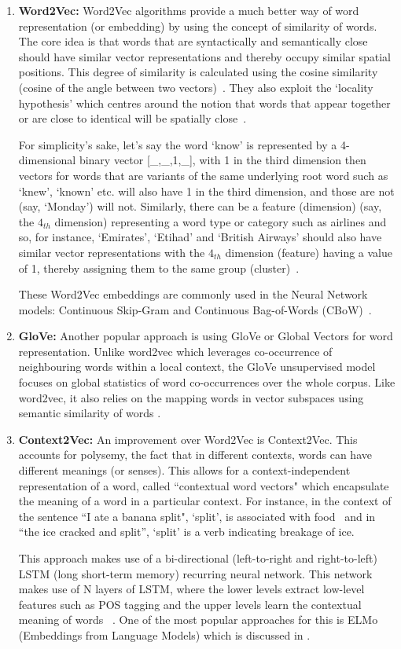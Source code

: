 \begin{enumerate}
    \item \textbf{Word2Vec:} Word2Vec algorithms provide a much better way of word representation (or embedding) by using the concept of similarity of words. The core idea is that words that are syntactically and semantically close should have similar vector representations and thereby occupy similar spatial positions. This degree of similarity is calculated using the cosine similarity (cosine of the angle between two vectors)~\cite{efficient_word_rep}. They also exploit the `locality hypothesis' which centres around the notion that words that appear together or are close to identical  will be spatially close~\cite{elmo_word_rep}.

For simplicity's sake, let's say the word `know' is represented by a 4-dimensional binary vector [\_,\_,1,\_], with 1 in the third dimension then vectors for words that are variants of the same underlying root word such as `knew', `known' etc. will also have 1 in the third dimension, and those are not (say, `Monday') will not. Similarly, there can be a feature (dimension) (say, the $4_{th}$ dimension) representing a word type or category such as airlines and so, for instance, `Emirates', `Etihad' and `British Airways' should also have similar vector representations with the $4_{th}$ dimension (feature) having a value of 1, thereby assigning them to the same group (cluster)~\cite{32_contextual_word}.

These Word2Vec embeddings are commonly used in the Neural Network models: Continuous Skip-Gram and Continuous Bag-of-Words (CBoW)~\cite{efficient_word_rep}.

\item \textbf{GloVe:} Another popular approach is using GloVe or Global Vectors for word representation. Unlike word2vec which leverages co-occurrence of neighbouring words within a local context, the GloVe unsupervised model focuses on global statistics of word co-occurrences over the whole corpus. Like word2vec, it also relies on the mapping words in vector subspaces using semantic similarity of words \cite{glove}. 

\item \textbf{Context2Vec:} An improvement over Word2Vec is Context2Vec. This accounts for polysemy, the fact that in different contexts, words can have different meanings (or senses). This allows for a context-independent representation of a word, called ``contextual word vectors" which encapsulate the meaning of a word in a particular context. For instance, in the context of the sentence ``I ate a banana split", `split', is associated with food~\cite{32_contextual_word} and in ``the ice cracked and split'', `split' is a verb indicating breakage of ice.

This approach makes use of a bi-directional (left-to-right and right-to-left) LSTM (long short-term memory) recurring neural network. This network makes use of N layers of LSTM, where the lower levels extract low-level features such as POS tagging and the upper levels learn the contextual meaning of words ~\cite{elmo_word_rep}. One of the most popular approaches for this is ELMo (Embeddings from Language Models) which is discussed in .
\end{enumerate}

